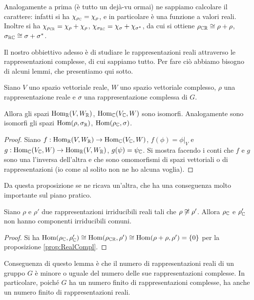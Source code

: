 	Analogamente a prima (è tutto un dejà-vu ormai) ne sappiamo calcolare il carattere: infatti si ha $\chi_{\rho_\mathbb C}=\chi_\rho$, e in particolare è una funzione a valori reali. Inoltre si ha $\chi_{\rho_{\mathbb C\mathbb R}}=\chi_\rho+\chi_\rho$, $\chi_{\sigma_{\mathbb R\mathbb C}}=\chi_\sigma+\chi_{\sigma^*}$, da cui si ottiene $\rho_{\mathbb C\mathbb R}\cong \rho+\rho$, $\sigma_{\mathbb R\mathbb C}\cong \sigma+\sigma^*$.
	
	Il nostro obbiettivo adesso è di studiare le rappresentazioni reali attraverso le rappresentazioni complesse, di cui sappiamo tutto. Per fare ciò abbiamo bisogno di alcuni lemmi, che presentiamo qui sotto.
	
	\begin{myprop}
		Siano $V$ uno spazio vettoriale reale, $W$ uno spazio vettoriale complesso, $\rho$ una rappresentazione reale e $\sigma$ una rappresentazione complessa di $G$.
		
		Allora gli spazi $\operatorname{Hom}_\mathbb R(V,W_\mathbb R)$, $\operatorname{Hom}_\mathbb C(V_\mathbb C,W)$ sono isomorfi. Analogamente sono isomorfi gli spazi $\operatorname{Hom}(\rho,\sigma_\mathbb R)$, $\operatorname{Hom}(\rho_\mathbb C,\sigma)$.
		\label{prop:RealCompl}
	\end{myprop}

	\begin{proof}
		Siano $f:\operatorname{Hom}_\mathbb R(V,W_\mathbb R) \rightarrow \operatorname{Hom}_\mathbb C(V_\mathbb C,W)$, $f(\phi)=\phi|_V$ e $g:\operatorname{Hom}_\mathbb C(V_\mathbb C,W) \rightarrow \operatorname{Hom}_\mathbb R(V,W_\mathbb R)$, $g(\psi)=\psi_\mathbb C$. Si mostra facendo i conti che $f$ e $g$ sono una l'inversa dell'altra e che sono omomorfismi di spazi vettoriali o di rappresentazioni (io come al solito non ne ho alcuna voglia).
	\end{proof}
	
	Da questa proposizione se ne ricava un'altra, che ha una conseguenza molto importante sul piano pratico.
	
	\begin{mylemma}
	 	Siano $\rho$ e $\rho'$ due rappresentazioni irriducibili reali tali che $\rho\not\cong\rho'$. Allora $\rho_\mathbb C$ e $\rho'_\mathbb C$ non hanno componenti irriducibili comuni.
	\end{mylemma}

	\begin{proof}
	 	Si ha $\operatorname{Hom}(\rho_\mathbb C,\rho'_\mathbb C)\cong\operatorname{Hom}(\rho_{\mathbb C\mathbb R},\rho')\cong\operatorname{Hom}(\rho+\rho,\rho')=\{0\}$ per la proposizione \ref{prop:RealCompl}.
	\end{proof}

	Conseguenza di questo lemma è che il numero di rappresentazioni reali di un gruppo $G$ è minore o uguale del numero delle sue rappresentazioni complesse. In particolare, poiché $G$ ha un numero finito di rappresentazioni complesse, ha anche un numero finito di rappresentazioni reali.
	
